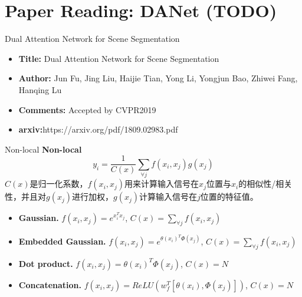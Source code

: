 \section{Paper Reading: DANet (TODO)}


\begin{frame}{Dual Attention Network for Scene Segmentation}
    \begin{itemize}
        \item \textbf{Title:} Dual Attention Network for Scene Segmentation
        \item \textbf{Author:} Jun Fu, Jing Liu, Haijie Tian, Yong Li, Yongjun Bao, Zhiwei Fang, Hanqing Lu
        \item \textbf{Comments:} Accepted by CVPR2019
        
        \item \textbf{arxiv:}https://arxiv.org/pdf/1809.02983.pdf
    \end{itemize}
\end{frame}


\begin{frame}{Non-local}
    \textbf{Non-local}
    \begin{equation}
        y_i=\frac{1}{C(x)}\sum_{\forall j}f(x_i,x_j)g(x_j)
    \end{equation}
    $C(x)$是归一化系数，$f(x_i,x_j)$用来计算输入信号在$x_j$位置与$x_i$的相似性/相关性，并且对$g(x_j)$进行加权，$g(x_j)$计算输入信号在$j$位置的特征值。
    \begin{itemize}
        \item \textbf{Gaussian.} $f(x_i,x_j)=e^{x_i^T x_j}$, $C(x)=\sum_{\forall j}f(x_i,x_j)$
        \item \textbf{Embedded Gaussian.} $f(x_i,x_j)=e^{\theta(x_i)^T \Phi(x_j)}$, $C(x)=\sum_{\forall j}f(x_i,x_j)$
        \item \textbf{Dot product.} $f(x_i,x_j)=\theta(x_i)^T \Phi(x_j)$, $C(x)=N$
        \item \textbf{Concatenation.} $f(x_i,x_j)=ReLU(w_f^T [\theta(x_i),\Phi(x_j)])$, $C(x)=N$
    \end{itemize}
\end{frame}

